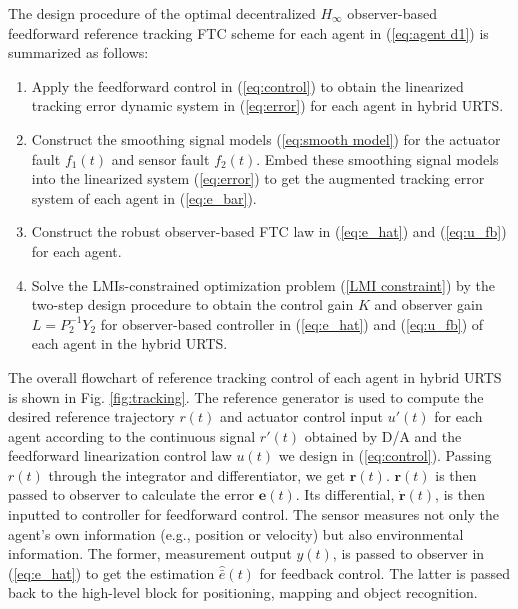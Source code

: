 \documentclass{ieeeaccess}
\begin{document}
The design procedure of the optimal decentralized $H_\infty$ observer-based feedforward reference tracking FTC scheme for each agent in (\ref{eq:agent d1}) is summarized as follows:
\begin{enumerate}
    \item Apply the feedforward control in (\ref{eq:control}) to obtain the linearized tracking error dynamic system in (\ref{eq:error}) for each agent in hybrid URTS.
    \item Construct the smoothing signal models (\ref{eq:smooth model}) for the actuator fault $f_1(t)$ and sensor fault $f_2(t)$. Embed these smoothing signal models into the linearized system (\ref{eq:error}) to get the augmented tracking error system of each agent in (\ref{eq:e_bar}).
    \item Construct the robust observer-based FTC law in (\ref{eq:e_hat}) and (\ref{eq:u_fb}) for each agent.
    \item Solve the LMIs-constrained optimization problem (\ref{LMI constraint}) by the two-step design procedure to obtain the control gain $K$ and observer gain $L=P_2^{-1}Y_2$ for observer-based controller in (\ref{eq:e_hat}) and (\ref{eq:u_fb}) of each agent in the hybrid URTS.
\end{enumerate}

The overall flowchart of reference tracking control of each agent in hybrid URTS is shown in Fig. \ref{fig:tracking}. The reference generator is used to compute the desired reference trajectory $r(t)$ and actuator control input $u'(t)$ for each agent according to the continuous signal $r'(t)$ obtained by D/A and the feedforward linearization control law $u(t)$ we design in (\ref{eq:control}). Passing $r(t)$ through the integrator and differentiator, we get $\pmb{r}(t)$. $\pmb{r}(t)$ is then passed to observer to calculate the error $\pmb{e}(t)$. Its differential, $\dot{\pmb{r}}(t)$, is then inputted to controller for feedforward control. The sensor measures not only the agent's own information (e.g., position or velocity) but also environmental information. The former, measurement output $y(t)$, is passed to observer in (\ref{eq:e_hat}) to get the estimation $\hat{\bar{e}}(t)$ for feedback control. The latter is passed back to the high-level block for positioning, mapping and object recognition.
\end{document}

